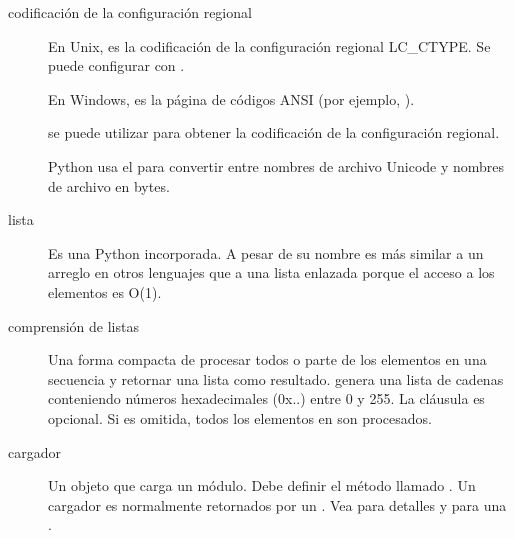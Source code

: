 \documentclass[a4,10pt,spanish]{sphinxmanual}
\begin{document}
\begin{description}
\item[{codificación de la configuración regional\label{\detokenize{glossary:term-locale-encoding}}}] \leavevmode
\sphinxAtStartPar
En Unix, es la codificación de la configuración regional LC\_CTYPE. Se puede configurar con .

\sphinxAtStartPar
En Windows, es la página de códigos ANSI (por ejemplo, ).

\sphinxAtStartPar
{} se puede utilizar para obtener la codificación de la configuración regional.

\sphinxAtStartPar
Python usa el {\hyperref[\detokenize{glossary:term-filesystem-encoding-and-error-handler}]{}} para convertir entre nombres de archivo Unicode y nombres de archivo en bytes.

\item[{lista\label{\detokenize{glossary:term-list}}}] \leavevmode
\sphinxAtStartPar
Es una {\hyperref[\detokenize{glossary:term-sequence}]{}} Python incorporada.  A pesar de su nombre es más similar a un arreglo en otros lenguajes que a una lista enlazada porque el acceso a los elementos es O(1).

\item[{comprensión de listas\label{\detokenize{glossary:term-list-comprehension}}}] \leavevmode
\sphinxAtStartPar
Una forma compacta de procesar todos o parte de los elementos en una secuencia y retornar una lista como resultado.   genera una lista de cadenas conteniendo números hexadecimales (0x..) entre 0 y 255. La cláusula  es opcional.  Si es omitida, todos los elementos en  son procesados.

\item[{cargador\label{\detokenize{glossary:term-loader}}}] \leavevmode
\sphinxAtStartPar
Un objeto que carga un módulo. Debe definir el método llamado .  Un cargador es normalmente retornados por un  {\hyperref[\detokenize{glossary:term-finder}]{}}. Vea  para detalles y  para una {\hyperref[\detokenize{glossary:term-abstract-base-class}]{}}.


\end{description}
\end{document}
